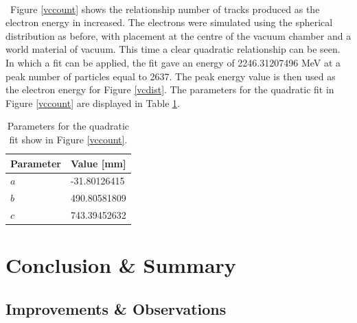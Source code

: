 \documentclass[12pt,a4paper]{article}
\begin{document}
\\\
\noindent Figure \ref{vccount} shows the relationship number of tracks produced as the electron energy in increased. The electrons were simulated using the spherical distribution as before, with placement at the centre of the vacuum chamber and a world material of vacuum. This time a clear quadratic relationship can be seen. In which a fit can be applied, the fit gave an energy of 2246.31207496 MeV at a peak number of particles equal to 2637. The peak energy value is then used as the electron energy for Figure \ref{vcdist}. The parameters for the quadratic fit in Figure \ref{vccount} are displayed in Table \ref{vctab}.
\\
\begin{table}[h!]
\centering
\begin{tabular}{|l|l|}
\hline
Parameter & Value [mm] \\ \hline
$a$ &  -31.80126415\\ \hline
$b$ &  490.80581809\\ \hline
$c$ &  743.39452632\\ \hline
\end{tabular}
\caption{Parameters for the quadratic fit show in Figure \ref{vccount}.}
\label{vctab}
\end{table}

\section{Conclusion \& Summary}
\label{conc}

\subsection{Improvements \& Observations}
\end{document}
